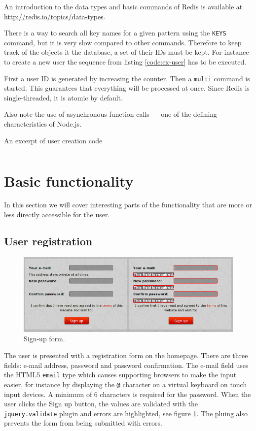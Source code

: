 \documentclass[12pt,oneside]{fithesis}
\begin{document}
	
	An introduction to the data types and basic commands of Redis is available at \url{http://redis.io/topics/data-types}.
	
	There is a way to search all key names for a given pattern using the \texttt{KEYS} command, but it is very slow compared to other commands. Therefore to keep track of the objects it the database, a set of their IDs must be kept. For instance to create a new user the sequence from listing \ref{code:ex-user} has to be executed.
	
	First a user ID is generated by increasing the counter. Then a \texttt{multi} command is started. This guarantees that everything will be processed at once. Since Redis is single-threaded, it is atomic by default.
	
	Also note the use of asynchronous function calls --- one of the defining characteristics of Node.js.
	\begin{program}[h!]
	\caption{An excerpt of user creation code}
	\label{code:ex-user}
	\inputminted[fontsize=\footnotesize, linenos=false]{javascript}{ex-user.js}
	\end{program}
	
	
\section{Basic functionality}
	In this section we will cover interesting parts of the functionality that are more or less directly accessible for the user.
	\subsection{User registration}	
	  \begin{figure}[h]
	  \centering
	    \includegraphics[width=1.0\textwidth]{screen-signup.png}
		  \caption{Sign-up form.}
		  \label{fig:screen-signup}
	  \end{figure}
		The user is presented with a registration form on the homepage. There are three fields: e-mail address, password and password confirmation. The e-mail field uses the HTML5 \texttt{email} type which causes supporting browsers to make the input easier, for instance by displaying the \texttt{@} character on a virtual keyboard on touch input devices. A minimum of 6 characters is required for the password. When the user clicks the Sign up button, the values are validated with the \texttt{jquery.validate} plugin and errors are highlighted, see figure \ref{fig:screen-signup}. The pluing also prevents the form from being submitted with errors.
		
\end{document}
